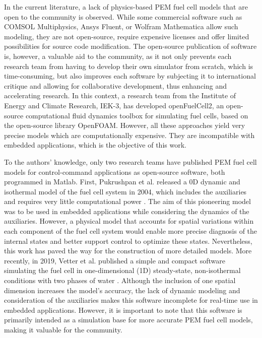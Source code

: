 \documentclass[postprint,3p,times]{elsarticle}
\begin{document}
In the current literature, a lack of physics-based PEM fuel cell models that are open to the community is observed. While some commercial software such as COMSOL Multiphysics\textregistered \cite{baoTwodimensionalModelingPolymer2015, mayurMultitimescaleModelingMethodology2015, COMSOLMultiphysicsSoftware}, Ansys Fluent\textregistered \cite{xie3D+1DModelingApproach2020, wuMathematicalModelingTransient2009, fanCharacteristicsPEMFCOperating2017, AnsysFluentFluid}, or Wolfram Mathematica\textregistered \cite{schumacher2+1DModellingPolymer2012, WolframMathematicaModern} allow such modeling, they are not open-source, require expensive licenses and offer limited possibilities for source code modification. The open-source publication of software is, however, a valuable aid to the community, as it not only prevents each research team from having to develop their own simulator from scratch, which is time-consuming, but also improves each software by subjecting it to international critique and allowing for collaborative development, thus enhancing and accelerating research. In this context, a research team from the Institute of Energy and Climate Research, IEK-3, has developed openFuelCell2, an open-source computational fluid dynamics toolbox for simulating fuel cells, based on the open-source library OpenFOAM\textregistered \cite{bealeOpensourceComputationalModel2016, zhangOpenFuelCell2NewComputational2024, zhangOpenFuelCell22023, OpenFOAM2024}. However, all these approaches yield very precise models which are computationally expensive. They are incompatible with embedded applications, which is the objective of this work.

To the authors' knowledge, only two research teams have published PEM fuel cell models for control-command applications as open-source software, both programmed in Matlab. First, Pukrushpan et al. released a 0D dynamic and isothermal model of the fuel cell system in 2004, which includes the auxiliaries and requires very little computational power \cite{pukrushpanControlOrientedModelingAnalysis2004, pukrushpanUniversityMichiganFuel2002}. The aim of this pioneering model was to be used in embedded applications while considering the dynamics of the auxiliaries. However, a physical model that accounts for spatial variations within each component of the fuel cell system would enable more precise diagnosis of the internal states and better support control to optimize these states. Nevertheless, this work has paved the way for the construction of more detailed models. More recently, in 2019, Vetter et al. published a simple and compact software simulating the fuel cell in one-dimensional (1D) steady-state, non-isothermal conditions with two phases of water \cite{vetterFreeOpenReference2019, schumacherPEMFC1DMMM2020}. Although the inclusion of one spatial dimension increases the model's accuracy, the lack of dynamic modeling and consideration of the auxiliaries makes this software incomplete for real-time use in embedded applications. However, it is important to note that this software is primarily intended as a simulation base for more accurate PEM fuel cell models, making it valuable for the community.
    
\end{document}
